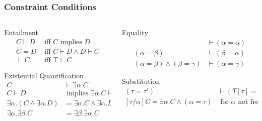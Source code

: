\documentclass[aspectratio=169]{beamer}
\begin{document}
\begin{frame}[fragile]
  \frametitle{Constraint Conditions}
  \begin{columns}
    \begin{column}{0.45\textwidth}
      \begin{block}{Entailment}
        \setlength\abovedisplayskip{0pt}
        \begin{align*}
          C ⊢ D & \text{ iff } C \text{ implies } D \\
          C = D & \text{ iff } C ⊢ D ∧ D ⊢ C        \\
          ⊢C    & \text{ iff } ⊤ ⊢ C
        \end{align*}
      \end{block}
      \begin{block}{Existential Quantification}
        \setlength\abovedisplayskip{0pt}
        \begin{align*}
          C             & ⊢ ∃α. C                      \\
          C ⊢ D         & \text{ implies } ∃α.C ⊢ ∃α.D \\
          ∃α.(C ∧ ∃α.D) & = ∃α.C ∧ ∃α.D                \\
          ∃α. ∃β.C      & = ∃β. ∃α.C
        \end{align*}
      \end{block}
    \end{column}
    \begin{column}{0.48\textwidth}
      \begin{block}{Equality}
        \setlength\abovedisplayskip{0pt}
        \begin{align*}
                            & ⊢ (α = α) \\
          (α = β)           & ⊢ (β = α) \\
          (α = β) ∧ (β = γ) & ⊢ (α = γ)
        \end{align*}
      \end{block}
      \begin{block}{Substitution}
        \setlength\abovedisplayskip{0pt}
        \begin{align*}
          (τ = τ′)                & ⊢ (Τ[τ] = Τ[τ′])                      \\
          [τ/α]C = ∃α.C ∧ (α = τ) & \text{ for } α \text{ not free in } τ
        \end{align*}
      \end{block}
    \end{column}
  \end{columns}
\end{frame}
\end{document}

